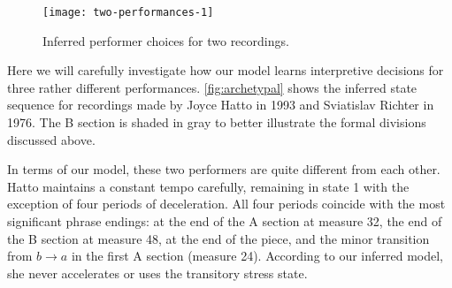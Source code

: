 \documentclass[12pt]{article}
\begin{document}
\begin{figure}[t]
  \centering
  \texttt{[image: two-performances-1]}
  \caption{Inferred performer choices for two recordings. }
  \label{fig:archetypal}
\end{figure}
Here we will carefully investigate how our model learns interpretive
decisions for three rather different performances. \autoref{fig:archetypal} shows the inferred state sequence for
recordings made by Joyce Hatto in 1993 and Sviatislav Richter in
1976. The B section is
shaded in gray to better illustrate the formal divisions discussed above.

In terms of our model, these two performers are quite different
from each other. Hatto maintains a constant tempo carefully, remaining
in state 1 with the exception of four periods of deceleration. All
four periods coincide with the most significant phrase endings: at the
end of the A section at measure 32, the end of the B section at
measure 48, at the end of the piece, and the minor transition from
$b\rightarrow a$ in the first A section (measure 24). According
to our inferred model, she never accelerates or uses the transitory
stress state.
\end{document}
